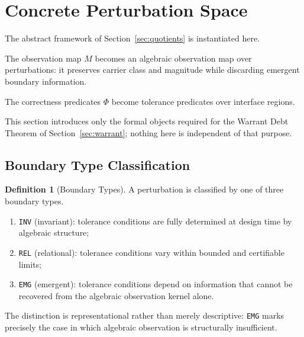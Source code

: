 \documentclass[12pt]{article}
\theoremstyle{plain}
\theoremstyle{definition}
\newtheorem{definition}[theorem]{Definition}
\theoremstyle{remark}
\begin{document}
\section{Concrete Perturbation Space}
\label{sec:perturbations}

The abstract framework of Section~\ref{sec:quotients} is instantiated
here.

The observation map $M$ becomes an algebraic observation map over
perturbations: it preserves carrier class and magnitude while
discarding emergent boundary information.

The correctness predicates $\Phi$ become tolerance predicates over
interface regions.

This section introduces only the formal objects required for the
Warrant Debt Theorem of Section~\ref{sec:warrant}; nothing here is
independent of that purpose.

\subsection{Boundary Type Classification}

\begin{definition}[Boundary Types]

A perturbation is classified by one of three boundary types.

\begin{enumerate}[label=(\roman*),noitemsep]
    \item \texttt{INV} (invariant):
    tolerance conditions are fully determined at design time by
    algebraic structure;

    \item \texttt{REL} (relational):
    tolerance conditions vary within bounded and certifiable limits;

    \item \texttt{EMG} (emergent):
    tolerance conditions depend on information that cannot be
    recovered from the algebraic observation kernel alone.
\end{enumerate}

The distinction is representational rather than merely descriptive:
\texttt{EMG} marks precisely the case in which algebraic observation
is structurally insufficient.

\end{definition}
\end{document}
